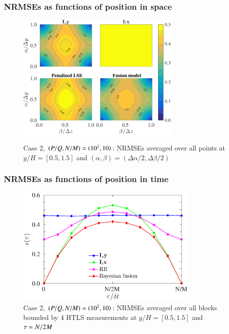 \documentclass{beamer}
\begin{document}
\begin{frame}
\frametitle{NRMSEs as functions of position in space}
	\begin{figure}
		\includegraphics[width=0.725\textwidth]{./figures/comparisons/channel/error_MAP_newOM1_boxin4HWs_outer.png}\
		\caption*{Case 2, $ (P/Q,N/M) = (10^2,10) $: NRMSEs averaged over all points at $ y/H=[0.5,1.5] $ and $ (\alpha,\beta) = (\Delta \alpha/2,\Delta \beta/2) $}		
	\end{figure}
\end{frame}

\begin{frame}
\frametitle{NRMSEs as functions of position in time}
	\begin{figure}
		\includegraphics[width=0.8\textwidth]{./figures/comparisons/channel/error_MAP_newOM1_middlepoint_outer.eps}
		\caption*{Case 2, $ (P/Q,N/M) = (10^2,10) $: NRMSEs averaged over all blocks bounded by 4 HTLS measurements at $ y/H=[0.5,1.5] $ and $ \tau = N/2M $}
	\end{figure}
\end{frame}
\end{document}
